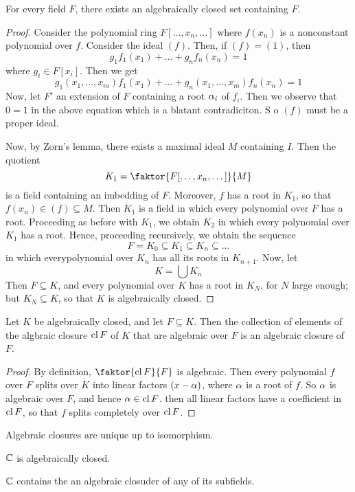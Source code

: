 \begin{lemma}\label{lemma_8.5.3}
  For every field $F$, there exists an algebraically closed set containing
  $F$.
\end{lemma}
\begin{proof}
  Consider the polynomial ring $F[\dots, x_n, \dots]$ where $f(x_n)$ is a
  nonconstant polynomial over $f$. Consider the ideal  $(f)$. Then, if
  $(f)=(1)$, then
  \begin{equation*}
    g_1f_1(x_1)+\dots+g_nf_n(x_n)=1
  \end{equation*}
  where $g_i \in F[x_i]$. Then we get
  \begin{equation*}
    g_1(x_1, \dots, x_m)f_1(x_1)+\dots+g_n(x_1, \dots, x_m)f_n(x_n)=1
  \end{equation*}
  Now, let $F'$ an extension of  $F$ containing a root  $\alpha_i$ of  $f_i$. Then
  we observe that  $0=1$ in the above equation which is a blatant
  contradiciton. S o $(f)$ must be a proper ideal.

  Now, by Zorn's lemma, there exists a maximal ideal $M$ containing $I$. Then
  the quotient
  \begin{equation*}
    K_1=\faktor{F[\dots, x_n, \dots]}{M}
  \end{equation*}
  is a field containing an imbedding of $F$. Moreover,  $f$ has a root in
  $K_1$, so that $f(x_n) \in  (f) \subseteq M$. Then $K_1$ is a field in which
  every polynomial over $F$ has a root. Proceeding as before with  $K_1$, we
  obtain $K_2$ in which every polynomial over $K_1$ has a root. Hence,
  proceeding recursively, we obtain the sequence
  \begin{equation*}
    F=K_0 \subseteq K_1 \subseteq K_n \subseteq \dots
  \end{equation*}
  in which everypolynomial over $K_n$ has all its roots in $K_{n+1}$. Now, let
  \begin{equation*}
    K=\bigcup{K_n}
  \end{equation*}
  Then $F \subseteq K$, and every polynomial over $K$ has a root in  $K_N$,
  for  $N$ large enough; but  $K_N \subseteq K$, so that  $K$ is algebraically
  closed.
\end{proof}

\begin{lemma}\label{lemma_8.5.4}
  Let $K$ be algebraically closed, and let  $F \subseteq K$. Then the
  collection of elements of the algbraic closure $\operatorname{cl}{F}$ of $K$ that are
  algebraic over $F$ is an algebraic closure of $F$.
\end{lemma}
\begin{proof}
  By definition, $\faktor{\cl{F}}{F}$ is algebraic. Then every polynomial $f$
  over  $F$ splits over  $K$ into linear factors $(x-\alpha)$, where $\alpha$ is a
  root of $f$. So  $\alpha$ is algebraic over  $F$, and hence  $\alpha \in \operatorname{cl}{F}$.
  then all linear factors have a coefficient in $\operatorname{cl}{F}$, so that $f$ splits
  completely over  $\operatorname{cl}{F}$.
\end{proof}
\begin{corollary}
  Algebraic closures are unique up to isomorphism.
\end{corollary}

\begin{theorem}\label{theorem_8.5.5}
  $\mathbb{C}$ is algebraically closed.
\end{theorem}
\begin{corollary}
  $\mathbb{C}$ contains the an algebraic closuder of any of its subfields.
\end{corollary}
